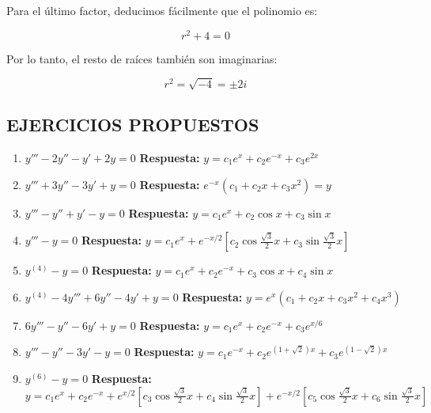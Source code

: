 Para el último factor, deducimos fácilmente que el polinomio es:

\[
r^2 + 4 = 0
\]

Por lo tanto, el resto de raíces también son imaginarias:

\[
r^2 = \sqrt{-4} = \pm 2i
\]

\subsection*{EJERCICIOS PROPUESTOS}

\begin{enumerate}
    \item \( y''' - 2y'' - y' + 2y = 0 \)  
    \textbf{Respuesta:} \( y = c_1 e^x + c_2 e^{-x} + c_3 e^{2x} \)

    \item \( y''' + 3y'' - 3y' + y = 0 \)  
    \textbf{Respuesta:} \( e^{-x} (c_1 + c_2 x + c_3 x^2) = y \)

    \item \( y''' - y'' + y' - y = 0 \)  
    \textbf{Respuesta:} \( y = c_1 e^x + c_2 \cos x + c_3 \sin x \)

    \item \( y''' - y = 0 \)  
    \textbf{Respuesta:} \( y = c_1 e^x + e^{-x/2} \left[ c_2 \cos \frac{\sqrt{3}}{2} x + c_3 \sin \frac{\sqrt{3}}{2} x \right] \)

    \item \( y^{(4)} - y = 0 \)  
    \textbf{Respuesta:} \( y = c_1 e^x + c_2 e^{-x} + c_3 \cos x + c_4 \sin x \)

    \item \( y^{(4)} - 4y''' + 6y'' - 4y' + y = 0 \)  
    \textbf{Respuesta:} \( y = e^x (c_1 + c_2 x + c_3 x^2 + c_4 x^3) \)

    \item \( 6y''' - y'' - 6y' + y = 0 \)  
    \textbf{Respuesta:} \( y = c_1 e^x + c_2 e^{-x} + c_3 e^{x/6} \)

    \item \( y''' - y'' - 3y' - y = 0 \)  
    \textbf{Respuesta:} \( y = c_1 e^{-x} + c_2 e^{(1+\sqrt{2})x} + c_3 e^{(1-\sqrt{2})x} \)

    \item \( y^{(6)} - y = 0 \)  
    \textbf{Respuesta:} \( y = c_1 e^x + c_2 e^{-x} + e^{x/2} \left[ c_3 \cos \frac{\sqrt{3}}{2} x + c_4 \sin \frac{\sqrt{3}}{2} x \right] + e^{-x/2} \left[ c_5 \cos \frac{\sqrt{3}}{2} x + c_6 \sin \frac{\sqrt{3}}{2} x \right] \)


\end{enumerate}
